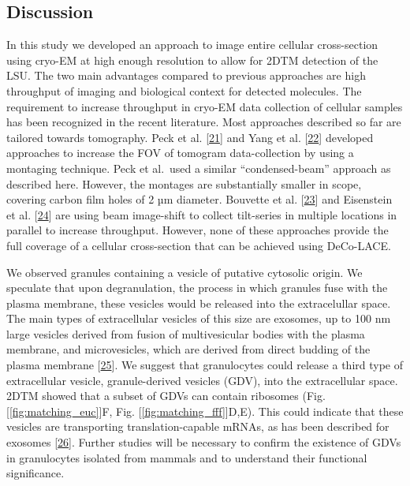 \documentclass[
]{article}
\begin{document}
\hypertarget{discussion}{%
\subsection{Discussion}\label{discussion}}

In this study we developed an approach to image entire cellular cross-section using cryo-EM at high enough resolution to allow for 2DTM detection of the LSU. The two main advantages compared to previous approaches are high throughput of imaging and biological context for detected molecules. The requirement to increase throughput in cryo-EM data collection of cellular samples has been recognized in the recent literature. Most approaches described so far are tailored towards tomography. Peck et al. {[}\protect\hyperlink{ref-1GPPSX111}{21}{]} and Yang et al. {[}\protect\hyperlink{ref-ujizcpVn}{22}{]} developed approaches to increase the FOV of tomogram data-collection by using a montaging technique. Peck et al.~used a similar ``condensed-beam'' approach as described here. However, the montages are substantially smaller in scope, covering carbon film holes of 2 µm diameter. Bouvette et al. {[}\protect\hyperlink{ref-1Gwx5ScUa}{23}{]} and Eisenstein et al. {[}\protect\hyperlink{ref-xvouNMBy}{24}{]} are using beam image-shift to collect tilt-series in multiple locations in parallel to increase throughput. However, none of these approaches provide the full coverage of a cellular cross-section that can be achieved using DeCo-LACE.

We observed granules containing a vesicle of putative cytosolic origin. We speculate that upon degranulation, the process in which granules fuse with the plasma membrane, these vesicles would be released into the extracelullar space. The main types of extracellular vesicles of this size are exosomes, up to 100 nm large vesicles derived from fusion of multivesicular bodies with the plasma membrane, and microvesicles, which are derived from direct budding of the plasma membrane {[}\protect\hyperlink{ref-kncnYGLD}{25}{]}. We suggest that granulocytes could release a third type of extracellular vesicle, granule-derived vesicles (GDV), into the extracellular space. 2DTM showed that a subset of GDVs can contain ribosomes (Fig. {[}\ref{fig:matching_euc}{]}F, Fig. {[}\ref{fig:matching_fff}{]}D,E). This could indicate that these vesicles are transporting translation-capable mRNAs, as has been described for exosomes {[}\protect\hyperlink{ref-agVdpX76}{26}{]}. Further studies will be necessary to confirm the existence of GDVs in granulocytes isolated from mammals and to understand their functional significance.
\end{document}
